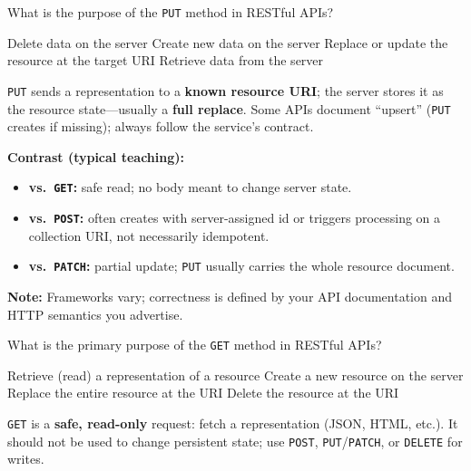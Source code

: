 \question[4]
What is the purpose of the \texttt{PUT} method in RESTful APIs?
\begin{choices}
  \choice Delete data on the server
  \choice Create new data on the server
  \CorrectChoice Replace or update the resource at the target URI
  \choice Retrieve data from the server
\end{choices}
\begin{solution}
  \texttt{PUT} sends a representation to a \textbf{known resource URI}; the server stores it as the resource state---usually a \textbf{full replace}. Some APIs document ``upsert'' (\texttt{PUT} creates if missing); always follow the service's contract.

  \noindent\textbf{Contrast (typical teaching):}
  \begin{itemize}
    \item \textbf{vs.\ \texttt{GET}:} safe read; no body meant to change server state.
    \item \textbf{vs.\ \texttt{POST}:} often creates with server-assigned id or triggers processing on a collection URI, not necessarily idempotent.
    \item \textbf{vs.\ \texttt{PATCH}:} partial update; \texttt{PUT} usually carries the whole resource document.
  \end{itemize}

  \noindent\textbf{Note:} Frameworks vary; correctness is defined by your API documentation and HTTP semantics you advertise.
\end{solution}

\newpage

\question[4]
What is the primary purpose of the \texttt{GET} method in RESTful APIs?
\begin{choices}
  \CorrectChoice Retrieve (read) a representation of a resource
  \choice Create a new resource on the server
  \choice Replace the entire resource at the URI
  \choice Delete the resource at the URI
\end{choices}
\begin{solution}
  \texttt{GET} is a \textbf{safe, read-only} request: fetch a representation (JSON, HTML, etc.). It should not be used to change persistent state; use \texttt{POST}, \texttt{PUT}/\texttt{PATCH}, or \texttt{DELETE} for writes.
\end{solution}


